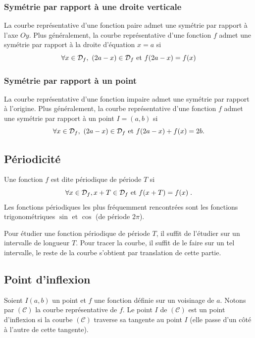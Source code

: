             \subsubsection{Sym\'etrie par rapport \`a une droite verticale}
                  La courbe repr\'esentative d'une fonction paire admet une sym\'etrie par rapport \`a l'axe $Oy$.
                  Plus g\'en\'eralement, 
                  la courbe repr\'esentative d'une fonction $f$ admet une sym\'etrie
                  par rapport \`a la droite d'\'equation $x=a$ si
                  \[   \forall x\in\mathcal{D}_f,\ (2a-x)\in\mathcal{D}_f \text{ et } f(2a-x) = f(x)   \]
            \subsubsection{Sym\'etrie par rapport \`a un point}
                  La courbe repr\'esentative d'une fonction impaire admet une sym\'etrie par rapport \`a l'origine.
                  Plus g\'en\'eralement, 
                  la courbe repr\'esentative d'une fonction $f$ admet une sym\'etrie par rapport \`a un point $I = (a,b)$ si
                  \[   \forall x\in\mathcal{D}_f,\ (2a-x)\in\mathcal{D}_f \text{ et } f(2a-x) + f(x) = 2 b .  \]
      \subsection{P\'eriodicit\'e}
            Une fonction $f$ est dite p\'eriodique de p\'eriode $T$ si 
                  \[ \forall x \in \mathcal{D}_f, x+T\in\mathcal{D}_f \text{ et } f(x+T) = f(x)      \;. \]
            Les fonctions p\'eriodiques les plus fr\'equemment rencontr\'ees sont 
            les fonctions trigonom\'etriques $\sin$ et $\cos$ (de p\'eriode $2\pi$).
            
            Pour \'etudier une fonction p\'eriodique de p\'eriode $T$, 
            il suffit de l'\'etudier sur un intervalle de longueur $T$.
            Pour tracer la courbe, il suffit de le faire sur un tel intervalle,
            le reste de la courbe s'obtient par translation de cette partie.
      \subsection{Point d'inflexion}
            Soient $I(a,b)$ un point et $f$ une fonction d\'efinie sur un voisinage de $a$.
            Notons par $(\mathscr{C})$ la courbe repr\'esentative de $f$.
            Le point $I$ de $(\mathscr{C})$ est un point d'inflexion si 
            la courbe $(\mathscr{C})$ traverse sa tangente au point $I$ (elle passe d'un c\^ot\'e \`a l'autre de cette tangente).
            
